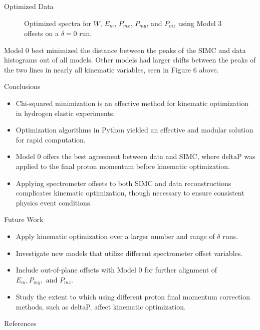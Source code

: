 \documentclass[final]{beamer}
\newlength{\colwidth}
\begin{document}
\begin{frame}[t]
\begin{columns}[t]
\begin{column}{\colwidth}
\begin{block}{Optimized Data}
\begin{figure}
\begin{minipage}[t]{0.3\textwidth}
  \end{minipage}
\vspace{-.75cm}
  \caption{Optimized spectra for $W$, $E_m$, $P_{mx}$, $P_{my}$, and $P_{mz}$ using Model 3 offsets on a $\delta=0$ run.}
\end{figure}
\vspace{-.75cm}
Model 0 best minimized the distance between the peaks of the SIMC and data histograms out of all models. Other models had larger shifts between the peaks of the two lines in nearly all kinematic variables, seen in Figure 6 above.

\end{block}
\vspace{-.5cm}
  \begin{exampleblock}{Conclusions}

    \begin{itemize}
        \item Chi-squared minimization is an effective method for kinematic optimization in hydrogen elastic experiments.
        \item Optimization algorithms in Python yielded an effective and modular solution for rapid computation.
        \item Model 0 offers the best agreement between data and SIMC, where deltaP was applied to the final proton momentum before kinematic optimization.
        \item Applying spectrometer offsets to both SIMC and data reconstructions complicates kinematic optimization, though necessary to ensure consistent physics event conditions.
    \end{itemize}

  \end{exampleblock}
\vspace{-1cm}
\begin{block}{Future Work}
\begin{itemize}
    \item Apply kinematic optimization over a larger number and range of $\delta$ runs.
    \item Investigate new models that utilize different spectrometer offset variables.
    \item Include out-of-plane offsets with Model 0 for further alignment of $E_m, P_{my},\text{ and } P_{mz}$.
    \item Study the extent to which using different proton final momentum correction methods, such as deltaP, affect kinematic optimization.
\end{itemize}
\end{block}
\vspace{-1.25cm}
\begin{block}{References}
\small{
\nocite{yero2020thesis}
\nocite{ibrahim2006thesis}
\printbibliography}
\end{block}



\end{column}
\end{columns}
\end{frame}
\end{document}
